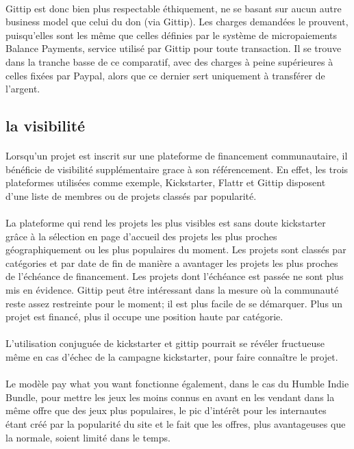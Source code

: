 \paragraph{}
Gittip est donc bien plus respectable éthiquement, ne se basant sur aucun autre
business model que celui du don (via Gittip). Les charges demandées le
prouvent, puisqu'elles sont les même que celles définies par le système de
micropaiements Balance Payments, service utilisé par Gittip pour toute
transaction. Il se trouve dans la tranche basse de ce comparatif, avec des
charges à peine supérieures à celles fixées par Paypal, alors que ce dernier
sert uniquement à transférer de l'argent.
\newpage

\subsection{la visibilité}

\paragraph{}
Lorsqu'un projet est inscrit sur une plateforme de financement communautaire,
il bénéficie de visibilité supplémentaire grace à son référencement. En effet,
les trois plateformes utilisées comme exemple, Kickstarter, Flattr et Gittip
disposent d'une liste de membres ou de projets classés par popularité.

\paragraph{}
La plateforme qui rend les projets les plus visibles est sans doute kickstarter
grâce à la sélection en page d'accueil des projets les plus proches
géographiquement ou les plus populaires du moment. Les projets sont classés par
catégories et par date de fin de manière a avantager les projets les plus
proches de l'échéance de financement. Les projets dont l'échéance est passée ne
sont plus mis en évidence.
Gittip peut être intéressant dans la mesure où la communauté reste assez
restreinte pour le moment; il est plus facile de se démarquer. Plus un projet
est financé, plus il occupe une position haute par catégorie.

\paragraph{}
L'utilisation conjuguée de kickstarter et gittip pourrait se révéler fructueuse
même en cas d'échec de la campagne kickstarter, pour faire connaître le projet.

\paragraph{}
Le modèle pay what you want fonctionne également, dans le cas du Humble Indie
Bundle, pour mettre les jeux les moins connus en avant en les vendant dans la
même offre que des jeux plus populaires, le pic d'intérêt pour les internautes
étant créé par la popularité du site et le fait que les offres, plus
avantageuses que la normale, soient limité dans le temps.
